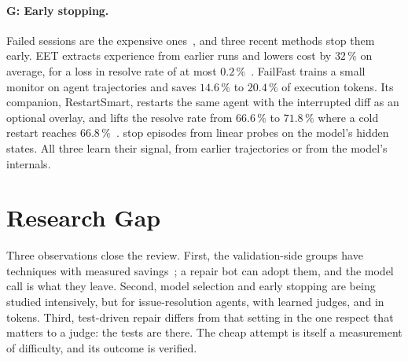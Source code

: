 \paragraph{G: Early stopping.} Failed sessions are the expensive
ones~\citep{fan2025sweeffi}, and three recent methods stop them early. EET
extracts experience from earlier runs and lowers cost by $32\,\%$ on average,
for a loss in resolve rate of at most $0.2\,\%$~\citep{guo2026eet}. FailFast
trains a small monitor on agent trajectories and saves $14.6\,\%$ to
$20.4\,\%$ of execution tokens. Its companion, RestartSmart, restarts the same
agent with the interrupted diff as an optional overlay, and lifts the resolve
rate from $66.6\,\%$ to $71.8\,\%$ where a cold restart reaches
$66.8\,\%$~\citep{wang2026failfast}. \citet{ruan2026doomed} stop episodes from
linear probes on the model's hidden states. All three learn their signal, from
earlier trajectories or from the model's internals.

\section{Research Gap}
\label{sec:rel-gap}

Three observations close the review. First, the validation-side groups have
techniques with measured
savings~\citep{chen2021uniapr,xiao2024expressapr,lou2024aprregression}; a
repair bot can adopt them, and the model call is what they leave. Second,
model selection and early stopping are being studied intensively, but for
issue-resolution agents, with learned judges, and in tokens. Third,
test-driven repair differs from that setting in the one respect that matters
to a judge: the tests are there. The cheap attempt is itself a measurement of
difficulty, and its outcome is verified.

